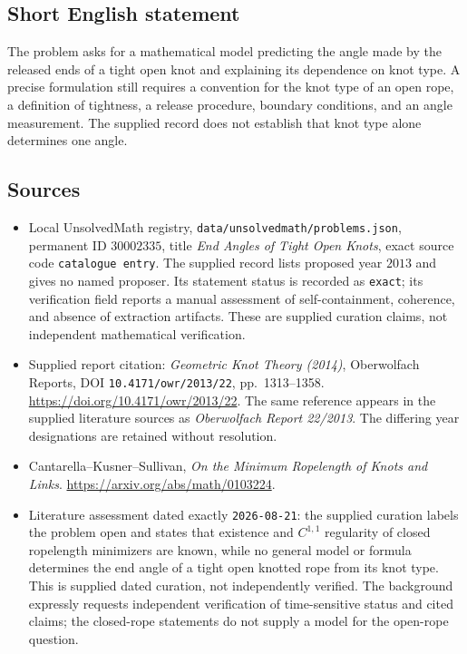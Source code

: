 \documentclass[11pt]{article}
\begin{document}
\subsection{Short English statement}
The problem asks for a mathematical model predicting the angle made by the released ends of a tight open knot and explaining its dependence on knot type. A precise formulation still requires a convention for the knot type of an open rope, a definition of tightness, a release procedure, boundary conditions, and an angle measurement. The supplied record does not establish that knot type alone determines one angle.
\subsection{Sources}
\begin{itemize}
\item Local UnsolvedMath registry, \texttt{data/unsolvedmath/problems.json}, permanent ID \(30002335\), title \emph{End Angles of Tight Open Knots}, exact source code \texttt{catalogue entry}. The supplied record lists proposed year \(2013\) and gives no named proposer. Its statement status is recorded as \texttt{exact}; its verification field reports a manual assessment of self-containment, coherence, and absence of extraction artifacts. These are supplied curation claims, not independent mathematical verification.
\item Supplied report citation: \emph{Geometric Knot Theory (2014)}, Oberwolfach Reports, DOI \texttt{10.4171/owr/2013/22}, pp.~1313--1358. \url{https://doi.org/10.4171/owr/2013/22}. The same reference appears in the supplied literature sources as \emph{Oberwolfach Report 22/2013}. The differing year designations are retained without resolution.
\item Cantarella--Kusner--Sullivan, \emph{On the Minimum Ropelength of Knots and Links}. \url{https://arxiv.org/abs/math/0103224}.
\item Literature assessment dated exactly \texttt{2026-08-21}: the supplied curation labels the problem open and states that existence and \(C^{1,1}\) regularity of closed ropelength minimizers are known, while no general model or formula determines the end angle of a tight open knotted rope from its knot type. This is supplied dated curation, not independently verified. The background expressly requests independent verification of time-sensitive status and cited claims; the closed-rope statements do not supply a model for the open-rope question.
\end{itemize}
\end{document}
